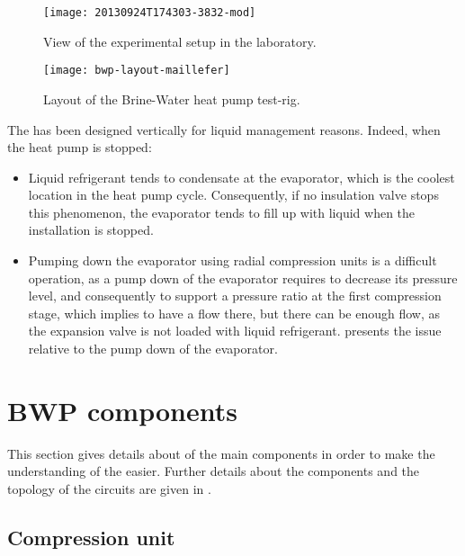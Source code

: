 \begin{figure}
  \centering
  \texttt{[image: 20130924T174303-3832-mod]}
  \caption{View of the experimental setup in the laboratory.}
  \label{fig:bwp_main_view}
\end{figure}

\begin{figure}
  \centering
  \texttt{[image: bwp-layout-maillefer]}
  \caption[Layout of the Brine-Water heat pump test-rig]
  {Layout of the Brine-Water heat pump test-rig.}
  \label{fig:bwp-layout}
\end{figure}

The \BWP{} has been designed vertically for liquid management
reasons. Indeed, when the heat pump is stopped:

\begin{itemize}
\item Liquid refrigerant tends to condensate at the evaporator, which
  is the coolest location in the heat pump cycle. Consequently, if no
  insulation valve stops this phenomenon, the evaporator tends to fill
  up with liquid when the installation is stopped.
\item Pumping down the evaporator using radial compression units is a
  difficult operation, as a pump down of the evaporator requires to
  decrease its pressure level, and consequently to support a pressure
  ratio at the first compression stage, which implies to have a flow
  there, but there can be enough flow, as the expansion valve is not
  loaded with liquid refrigerant.  presents the
  issue relative to the pump down of the evaporator.
\end{itemize}

\section{BWP components}
\label{sec:bwp-main-components}

This section gives details about of the main components in order to
make the understanding of the
 easier. Further details
about the components and the topology of the circuits are given in
.

\subsection{Compression unit}
\label{sec:bwp-cp-unit}

